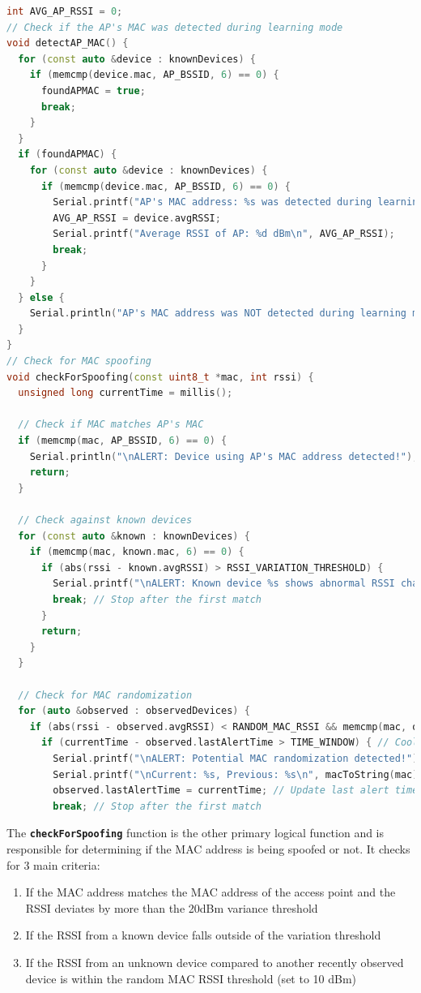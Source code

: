 \documentclass[letterpaper, 11pt]{article}
\begin{document}
\newpage
\begin{lstlisting}[language=C++, caption=Spoof Detection, label=lst:spoof detector]
int AVG_AP_RSSI = 0;
// Check if the AP's MAC was detected during learning mode
void detectAP_MAC() {
  for (const auto &device : knownDevices) {
    if (memcmp(device.mac, AP_BSSID, 6) == 0) {
      foundAPMAC = true;
      break;
    }
  }
  if (foundAPMAC) {
    for (const auto &device : knownDevices) {
      if (memcmp(device.mac, AP_BSSID, 6) == 0) {
        Serial.printf("AP's MAC address: %s was detected during learning mode. RSSI: %d dBm\n", macToString(device.mac).c_str(), device.avgRSSI);
        AVG_AP_RSSI = device.avgRSSI;
        Serial.printf("Average RSSI of AP: %d dBm\n", AVG_AP_RSSI);
        break;
      }
    }
  } else {
    Serial.println("AP's MAC address was NOT detected during learning mode.");
  }
}
// Check for MAC spoofing
void checkForSpoofing(const uint8_t *mac, int rssi) {
  unsigned long currentTime = millis();

  // Check if MAC matches AP's MAC
  if (memcmp(mac, AP_BSSID, 6) == 0) {
    Serial.println("\nALERT: Device using AP's MAC address detected!");
    return;
  }

  // Check against known devices
  for (const auto &known : knownDevices) {
    if (memcmp(mac, known.mac, 6) == 0) {
      if (abs(rssi - known.avgRSSI) > RSSI_VARIATION_THRESHOLD) {
        Serial.printf("\nALERT: Known device %s shows abnormal RSSI change! Current RSSI: %d dBm, Known Avg RSSI: %d dBm", macToString(mac).c_str(), rssi, known.avgRSSI);
        break; // Stop after the first match
      }
      return;
    }
  }

  // Check for MAC randomization
  for (auto &observed : observedDevices) {
    if (abs(rssi - observed.avgRSSI) < RANDOM_MAC_RSSI && memcmp(mac, observed.mac, 6) != 0 && (currentTime - observed.lastSeen) < TIME_WINDOW) {
      if (currentTime - observed.lastAlertTime > TIME_WINDOW) { // Cooldown check
        Serial.printf("\nALERT: Potential MAC randomization detected!");
        Serial.printf("\nCurrent: %s, Previous: %s\n", macToString(mac).c_str(), macToString(observed.mac).c_str());
        observed.lastAlertTime = currentTime; // Update last alert time
        break; // Stop after the first match
\end{lstlisting}

The \textbf{\lstinline[]|checkForSpoofing|} function is the other primary logical function and is responsible for determining if the MAC address is being spoofed or not. It checks for 3 main criteria:
\begin{enumerate}
    \item If the MAC address matches the MAC address of the access point and the RSSI deviates by more than the 20dBm variance threshold
    \item If the RSSI from a known device falls outside of the variation threshold
    \item If the RSSI from an unknown device compared to another recently observed device is within the random MAC RSSI threshold (set to 10 dBm) 
\end{enumerate}
\vspace {2mm}
\end{document}
